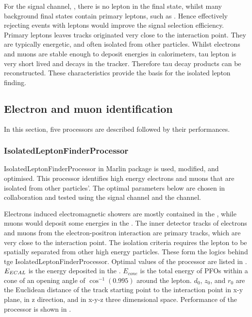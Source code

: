 For the signal channel, \eeToHHbbWWHad, there is no lepton in the final state, whilst many background final states contain primary leptons, such as \HepProcess{\Pquark \Pquark \Pquark \Pquark \Plepton \Pnu}. Hence effectively rejecting events with leptons would improve the signal selection efficiency. Primary leptons leaves tracks originated  very close to the interaction point. They are typically energetic, and often isolated from other particles. Whilst electrons and muons are stable enough to deposit energies in calorimeters, tau lepton is very short lived and decays in the tracker. Therefore tau decay products can be reconstructed. These characteristics provide the basis for the isolated lepton finding.

\subsection{Electron and muon identification}
\label{sec:doubleHiggsLeptonID}
In this section, five processors are described followed by their performances.

\subsubsection{IsolatedLeptonFinderProcessor}
\label{sec:doubleHiggsIsolatedLeptonFinder}
IsolatedLeptonFinderProcessor in Marlin package is used, modified, and optimised. This processor identifies high energy electrons and muons that are isolated from other particles'. The optimal parameters below are chosen in collaboration and tested using the signal channel and the \eeTo{ \Pquark \Pquark \Pquark \Pquark \Plepton \Pnu} channel.

Electrons induced electromagnetic showers are mostly contained in the \ECAL, while muons would deposit some energies in the \ECAL. The inner detector tracks of electrons and muons from the electron-positron interaction are primary tracks, which are very close to the interaction point. The isolation criteria requires the lepton to be spatially separated from other high energy particles. These form the logics behind tge IsolatedLeptonFinderProcessor. Optimal values of the processor are listed in . $E_{ECAL}$ is the energy deposited in the \ECAL. $E_{cone}$ is the total energy of PFOs within a cone of an opening angle of $\cos^{-1}(0.995)$ around the lepton. $d_0$, $z_0$, and $r_0$ are the Euclidean distance of the track starting point to the interaction point in x-y plane, in z direction, and in x-y-z three dimensional space. Performance of the processor is shown in .

